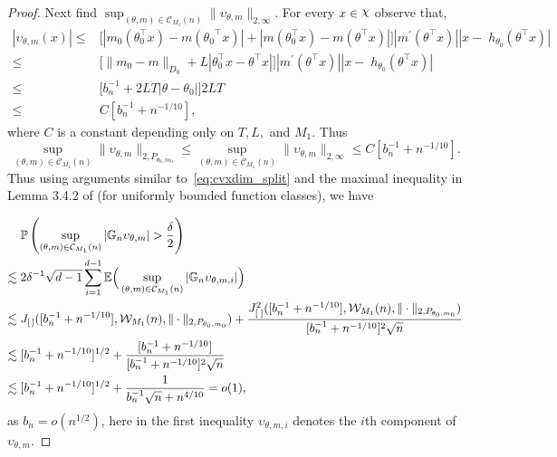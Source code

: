{\begin{proof}
Next find $\sup_{(\theta,m) \in \mathcal{C}_{M_1}(n) }\|\upsilon_{\theta,m}\|_{2,\infty}.$ For every $x \in \rchi$ observe that,
\begin{align*}
|\upsilon_{\theta, m}(x)|
\leq{}& \big[|m_0(\theta_0^\top x) -m({\theta_0}^\top x)| + |m(\theta_0^\top x) -m(\theta^\top x)|\big] |m^\prime (\theta^\top x)|    |x- \;h_{\theta_0} (\theta ^\top x)| \\
\leq{}& \big[\|m_0 -m\|_{D_0} + L|\theta_0^\top x -\theta^\top x|\big] |m^\prime (\theta^\top x)|    |x- \;h_{\theta_0} (\theta ^\top x)| \\
 \leq{}&\big[b_n^{-1} + 2LT |\theta-\theta_0|] 2L T\\
 \le{}& C [b_n^{-1} + n^{-1/10}],
\end{align*}
where $C$ is a constant depending only on $T,L,$ and $ M_1$. Thus \[
\sup_{(\theta,m) \in \mathcal{C}_{M_1}(n) }\|\upsilon_{\theta,m}\|_{2,P_{\theta_0,m_0}}\le \sup_{(\theta,m) \in \mathcal{C}_{M_1}(n) }\|\upsilon_{\theta,m}\|_{2,\infty} \le C [b_n^{-1} + n^{-1/10}].\]
Thus using arguments similar to~\eqref{eq:cvxdim_split} and the  maximal inequality in Lemma 3.4.2 of \cite{VdVW96} (for uniformly bounded function classes), we have


\begin{align*}
&\p\left(\sup_{(\theta,m ) \in \mathcal{C}_{M_1}(n) } |\g_n \upsilon_{\theta, m}|> \frac{\delta}{2}\right) \\
 \lesssim{}&  2 \delta^{-1} \sqrt{d-1}\sum_{i=1}^{d-1} \mathbb{E} \Big(\sup_{(\theta,m ) \in \mathcal{C}_{M_1}(n) } |\g_n \upsilon_{\theta, m,i}|\Big)\\
\lesssim{}& J_{[\,]}([b_n^{-1} + n^{-1/10}],\w_{M_1}(n), \|\cdot\|_{2,P_{\theta_0,m_0}})+ \frac{J^2_{[\;]}([b_n^{-1} + n^{-1/10}],\w_{M_1}(n), \|\cdot\|_{2,P_{\theta_0,m_0}})}{[b_n^{-1} + n^{-1/10}]^2\sqrt{n}} \\
\lesssim{}&  [b_n^{-1} + n^{-1/10}]^{1/2} +\frac{ [b_n^{-1} + n^{-1/10}]}{[b_n^{-1} + n^{-1/10}]^2\sqrt{n}} \\
\lesssim{}& [b_n^{-1} + n^{-1/10}]^{1/2} +\frac{ 1}{b_n^{-1} \sqrt{n} + n^{4/10}} =o(1),
\end{align*}
 as $b_n=o(n^{1/2})$, here in the first inequality $\upsilon_{\theta, m,i}$ denotes the $i$th component of $\upsilon_{\theta, m}.$
\end{proof}



}
